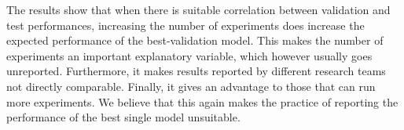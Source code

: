 \documentclass{article}
\newcommand{\ml}{\gls{ml}\xspace}
\begin{document}
\begin{appendices}
The results show that when there is suitable correlation between validation and test performances, increasing the number of experiments does increase the expected performance of the best-validation model. This makes the number of experiments an important explanatory variable, which however usually goes unreported. Furthermore, it makes results reported by different research teams not directly comparable. Finally, it gives an advantage to those that can run more experiments. We believe that this again makes the practice of reporting the performance of the best single model unsuitable. 









\end{appendices}
\end{document}
